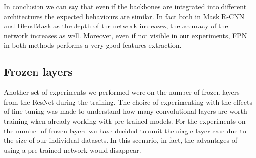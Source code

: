 \documentclass[10pt,twocolumn,letterpaper]{article}
\begin{document}
In conclusion we can say that even if the backbones are integrated into different architectures the expected behaviours are similar. 
In fact both in Mask R-CNN and BlendMask as the depth of the network increases, the accuracy of the network increases as well. 
Moreover, even if not visible in our experiments, FPN in both methods performs a very good features extraction.



\subsection{Frozen layers}
Another set of experiments we performed were on the number of frozen layers from the ResNet during the training. The choice of experimenting with the effects of fine-tuning was made to understand how many convolutional layers are worth training when already working with pre-trained models.
For the experiments on the number of frozen layers we have decided to omit the single layer case due to the size of our individual datasets. In this scenario, in fact, the advantages of using a pre-trained network would disappear.
\end{document}

